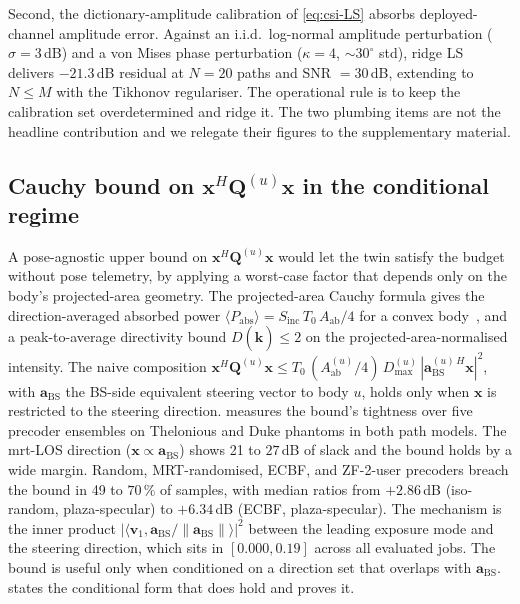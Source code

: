 \documentclass[journal,twocolumn,10pt]{IEEEtran}
\theoremstyle{plain}
\theoremstyle{remark}
\newcommand{\khat}{\hat{\bm{k}}}
\newcommand{\xx}{\mathbf{x}}
\newcommand{\Sinc}{S_{\mathrm{inc}}}
\newcommand{\Pabs}{P_{\mathrm{abs}}}
\newcommand{\Aab}{A_{\mathrm{ab}}}
\newcommand{\Qmat}{\mathbf{Q}}
\begin{document}
Second, the dictionary-amplitude calibration of \cref{eq:csi-LS}
absorbs deployed-channel amplitude error. Against an i.i.d.\
log-normal amplitude perturbation ($\sigma = 3\,$dB) and a von Mises
phase perturbation ($\kappa = 4$, $\sim 30^\circ$ std), ridge LS
delivers $-21.3\,$dB residual at $N = 20$ paths and SNR $= 30\,$dB,
extending to $N \leq M$ with the Tikhonov regulariser. The operational
rule is to keep the calibration set overdetermined and ridge it. The
two plumbing items are not the headline contribution and we relegate
their figures to the supplementary material.

\subsection{Cauchy bound on $\xx^H \Qmat^{(u)} \xx$
in the conditional regime}\label{sec:eval-cauchy}

A pose-agnostic upper bound on $\xx^H \Qmat^{(u)} \xx$ would let the
twin satisfy the budget without pose telemetry, by applying a
worst-case factor that depends only on the body's projected-area
geometry. The projected-area Cauchy formula gives the
direction-averaged absorbed power $\langle \Pabs \rangle =
\Sinc\,T_0\,\Aab/4$ for a convex body~\cite{Cauchy1841}, and a
peak-to-average directivity bound $D(\khat) \leq 2$ on the
projected-area-normalised intensity. The naive composition
$\xx^H \Qmat^{(u)} \xx \leq T_0\,(\Aab^{(u)}/4)\,D_{\max}^{(u)}\,
|\mathbf{a}_{\mathrm{BS}}^{(u)\,H} \xx|^2$, with
$\mathbf{a}_{\mathrm{BS}}$ the BS-side equivalent steering vector
to body $u$, holds only when $\xx$ is restricted to the steering
direction. \Cref{fig:tightness} measures the bound's tightness
over five precoder ensembles on Thelonious and Duke phantoms in both
path models. The mrt-LOS direction
($\xx \propto \mathbf{a}_{\mathrm{BS}}$) shows 21 to $27\,$dB of
slack and the bound holds by a wide margin. Random,
MRT-randomised, ECBF, and ZF-2-user precoders breach the bound
in 49 to $70\,\%$ of samples, with median ratios from $+2.86\,$dB
(iso-random, plaza-specular) to $+6.34\,$dB (ECBF, plaza-specular).
The mechanism is the inner product
$|\langle \mathbf{v}_1, \mathbf{a}_{\mathrm{BS}}/
\|\mathbf{a}_{\mathrm{BS}}\| \rangle|^2$ between the leading
exposure mode and the steering direction, which sits in
$[0.000, 0.19]$ across all evaluated jobs. The bound is useful
only when conditioned on a direction set that overlaps with
$\mathbf{a}_{\mathrm{BS}}$.  states the conditional
form that does hold and proves it.
\end{document}
